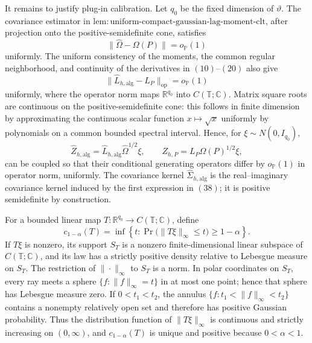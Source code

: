 It remains to justify plug-in calibration.  Let \(q_0\) be the fixed dimension of \(\vartheta\).  The covariance estimator in \(\mathrm{lem{:}uniform\mbox{-}compact\mbox{-}gaussian\mbox{-}lag\mbox{-}moment\mbox{-}clt}\), after projection onto the positive-semidefinite cone, satisfies
\[
 \|\widehat\Omega-\Omega(P)\|=o_{\mathbb P}(1)
\tag{36}
\]
uniformly.  The uniform consistency of the moments, the common regular neighborhood, and continuity of the derivatives in \((10)\)--\((20)\) also give
\[
 \|\widehat L_{h,\mathrm{alg}}-L_P\|_{\mathrm{op}}
 =o_{\mathbb P}(1)
\tag{37}
\]
uniformly, where the operator norm maps \(\mathbb R^{q_0}\) into \(C(\mathbb T;\mathbb C)\).  Matrix square roots are continuous on the positive-semidefinite cone: this follows in finite dimension by approximating the continuous scalar function \(x\mapsto\sqrt x\) uniformly by polynomials on a common bounded spectral interval.  Hence, for \(\xi\sim N(0,I_{q_0})\),
\[
 \widehat Z_{h,\mathrm{alg}}
 =\widehat L_{h,\mathrm{alg}}\widehat\Omega^{1/2}\xi,
 \qquad
 Z_{h,P}=L_P\Omega(P)^{1/2}\xi,
\tag{38}
\]
can be coupled so that their conditional generating operators differ by \(o_{\mathbb P}(1)\) in operator norm, uniformly.  The covariance kernel \(\widehat\Sigma_{h,\mathrm{alg}}\) is the real--imaginary covariance kernel induced by the first expression in \((38)\); it is positive semidefinite by construction.

For a bounded linear map \(T:\mathbb R^{q_0}\to C(\mathbb T;\mathbb C)\), define
\[
 c_{1-\alpha}(T)
 =\inf\left\{t:
 \Pr\bigl(\|T\xi\|_\infty\le t\bigr)\ge1-\alpha
 \right\}.
\tag{39}
\]
If \(T\xi\) is nonzero, its support \(S_T\) is a nonzero finite-dimensional linear subspace of \(C(\mathbb T;\mathbb C)\), and its law has a strictly positive density relative to Lebesgue measure on \(S_T\).  The restriction of \(\|\cdot\|_\infty\) to \(S_T\) is a norm.  In polar coordinates on \(S_T\), every ray meets a sphere \(\{f:\|f\|_\infty=t\}\) in at most one point; hence that sphere has Lebesgue measure zero.  If \(0<t_1<t_2\), the annulus \(\{f:t_1<\|f\|_\infty<t_2\}\) contains a nonempty relatively open set and therefore has positive Gaussian probability.  Thus the distribution function of \(\|T\xi\|_\infty\) is continuous and strictly increasing on \((0,\infty)\), and \(c_{1-\alpha}(T)\) is unique and positive because \(0<\alpha<1\).


